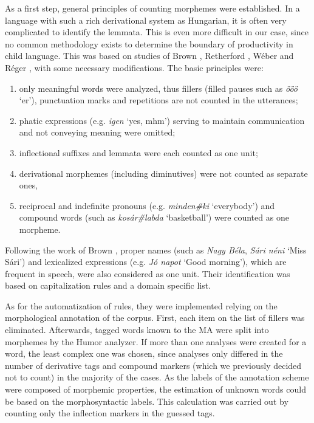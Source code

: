 As a first step, general principles of counting morphemes were established. 
In a language with such a rich derivational system as Hungarian, it is often very complicated to identify the lemmata. 
This is even more difficult in our case, since no common methodology exists to determine the boundary of productivity in child language. 
This was based on studies of Brown \cite{Brown1973}, Retherford \cite{retherford1993guide}, Wéber \cite{Weber2011} and Réger \cite{Reger1990}, with some necessary modifications. 
The basic principles were: 
\begin{enumerate}
 \item only meaningful words were analyzed, thus fillers (filled pauses such as \textit{ööö} `er’), punctuation marks and repetitions are not counted in the utterances;
 \item phatic expressions (e.g. \textit{igen} `yes, mhm’) serving to maintain communication and not conveying meaning were omitted;
 \item inflectional suffixes and lemmata were each counted as one unit; 
 \item derivational morphemes (including diminutives) were not counted as separate ones,
 \item reciprocal and indefinite pronouns (e.g. \textit{minden\#ki} `everybody’) and compound words (such as \textit{kosár\#labda} `basketball’) were counted as one morpheme.
 \end{enumerate}
 
Following the work of Brown \cite{Brown1973}, proper names (such as \textit{Nagy Béla}, \textit{Sári néni} `Miss Sári’) and lexicalized expressions (e.g. \textit{Jó napot} `Good morning’), which are frequent in speech, were also considered as one unit. 
Their identification was based on capitalization rules and a domain specific list.

As for the automatization of rules, they were implemented relying on the morphological annotation of the corpus. 
First, each item on the list of fillers was eliminated.
Afterwards, tagged words known to the MA were split into morphemes by the Humor analyzer. 
If more than one analyses were created for a word, the least complex one was chosen, since analyses only differed in the number of derivative tags and compound markers (which we previously decided not to count) in the majority of the cases.
As the labels of the annotation scheme were composed of morphemic properties, the estimation of unknown words could be based on the morphosyntactic labels. 
This calculation was carried out by counting only the inflection markers in the guessed tags. 

